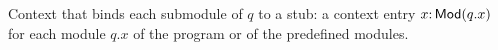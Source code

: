 Context that binds each submodule of $q$ to a stub: a context entry $x\mathord{:}\,\mathsf{Mod}(q.x)$ for each module
$q.x$ of the program or of the predefined modules.
